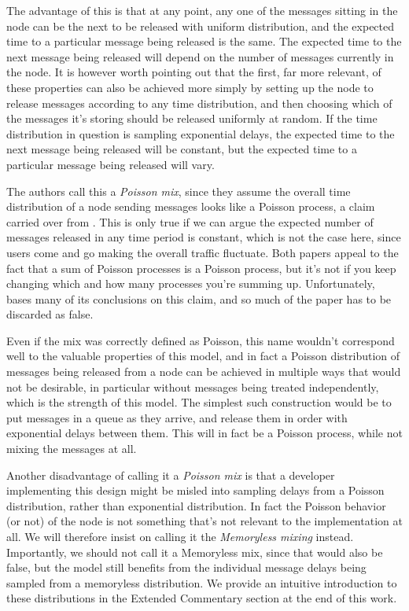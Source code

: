 \documentclass{article}
\begin{document}
The advantage of this is that at any point, any one of the messages sitting in the node can be the next to be released with uniform distribution, and the expected time to a particular message being released is the same. The expected time to the next message being released will depend on the number of messages currently in the node. It is however worth pointing out that the first, far more relevant, of these properties can also be achieved more simply by setting up the node to release messages according to any time distribution, and then choosing which of the messages it's storing should be released uniformly at random. If the time distribution in question is sampling exponential delays, the expected time to the next message being released will be constant, but the expected time to a particular message being released will vary.

The authors call this a \textit{Poisson mix}, since they assume the overall time distribution of a node sending messages looks like a Poisson process, a claim carried over from . This is only true if we can argue the expected number of messages released in any time period is constant, which is not the case here, since users come and go making the overall traffic fluctuate. Both papers appeal to the fact that a sum of Poisson processes is a Poisson process, but it's not if you keep changing which and how many processes you're summing up. Unfortunately,  bases many of its conclusions on this claim, and so much of the paper has to be discarded as false.

Even if the mix was correctly defined as Poisson, this name wouldn't correspond well to the valuable properties of this model, and in fact a Poisson distribution of messages being released from a node can be achieved in multiple ways that would not be desirable, in particular without messages being treated independently, which is the strength of this model. The simplest such construction would be to put messages in a queue as they arrive, and release them in order with exponential delays between them. This will in fact be a Poisson process, while not mixing the messages at all.

Another disadvantage of calling it a  \textit{Poisson mix} is that a developer implementing this design might be misled into sampling delays from a Poisson distribution, rather than exponential distribution. In fact the Poisson behavior (or not) of the node is not something that's not relevant to the implementation at all. We will therefore insist on calling it the \textit{Memoryless mixing} instead. Importantly, we should not call it a Memoryless mix, since that would also be false, but the model still benefits from the individual message delays being sampled from a memoryless distribution. We provide an intuitive introduction to these distributions in the Extended Commentary section at the end of this work.\medskip
\end{document}
